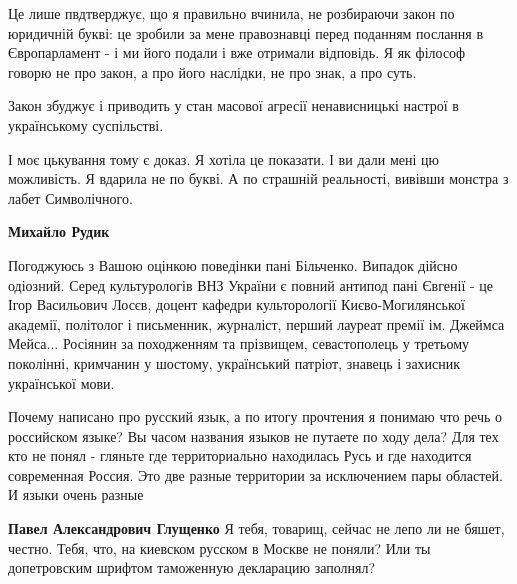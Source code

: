 \begin{itemize}
\begin{itemize}
Це лише пвдтверджує, що я правильно вчинила, не розбираючи закон по юридичній
букві: це зробили за мене правознавці перед поданням послання в Європарламент -
і ми його подали і вже отримали відповідь.  Я як філософ говорю не про закон, а
про його наслідки, не про знак, а про суть.

Закон збуджує і приводить у стан масової агресії ненависницькі настрої в
українському суспільстві. 

І моє цькування тому є доказ. Я хотіла це показати. І ви дали мені цю
можливість. Я вдарила не по букві. А по страшній реальності, вивівши монстра з
лабет Символічного.



\textbf{Михайло Рудик} 

Погоджуюсь з Вашою оцінкою поведінки пані Більченко. Випадок дійсно одіозний.
Серед культурологів ВНЗ України є повний антипод пані Євгенії - це Ігор
Васильович Лосєв, доцент кафедри культорології Києво-Могилянської академії,
політолог і письменник, журналіст, перший лауреат премії ім. Джеймса Мейса...
Росіянин за походженням та прізвищем, севастополець у третьому поколінні,
кримчанин у шостому, український патріот, знавець і захисник української мови.


\end{itemize}



Почему написано про русский язык, а по итогу прочтения я понимаю что речь о
российском языке? Вы часом названия языков не путаете по ходу дела? Для тех кто
не понял - гляньте где территориально находилась Русь и где находится
современная Россия. Это две разные территории за исключением пары областей. И
языки очень разные

\begin{itemize}


\textbf{Павел Александрович Глущенко} Я тебя, товарищ, сейчас не лепо ли не
бяшет, честно. Тебя, что, на киевском русском в Москве не поняли? Или ты
допетровским шрифтом таможенную декларацию заполнял?




\end{itemize}
\end{itemize}
